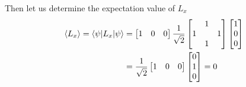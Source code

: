 \documentclass[../../../main.tex]{subfiles}
\begin{document}
Then let us determine the expectation value of $L_x$
\begin{align*}
    \braket{L_x}=\braket{\psi|L_x|\psi} & =
    \begin{bmatrix}
        1 & 0 & 0
    \end{bmatrix}
    \frac{1 }{\sqrt{2 }}\begin{bmatrix}
                              & 1 &   \\
                            1 &   & 1 \\
                              & 1 &   \\
                        \end{bmatrix}
    \begin{bmatrix}
        1 \\
        0 \\
        0 \\
    \end{bmatrix}                          \\
                                        & =
    \frac{1 }{\sqrt{2}}
    \begin{bmatrix}
        1 & 0 & 0
    \end{bmatrix}
    \begin{bmatrix}
        0 \\
        1 \\
        0 \\
    \end{bmatrix}
    =
    0
\end{align*}
\end{document}
